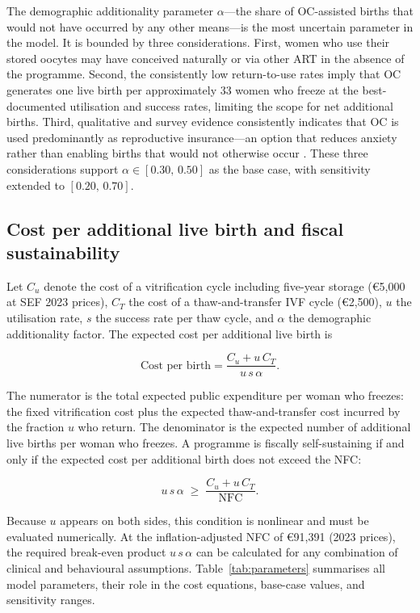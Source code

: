 \documentclass[12pt,a4paper]{article}
\begin{document}
The demographic additionality parameter $\alpha$---the share of
OC-assisted births that would not have occurred by any other means---is
the most uncertain parameter in the model. It is bounded by three
considerations. First, women who use their stored oocytes may have
conceived naturally or via other ART in the absence of the programme.
Second, the consistently low return-to-use rates imply that OC
generates one live birth per approximately 33 women who freeze at the
best-documented utilisation and success rates, limiting the scope for
net additional births. Third, qualitative and survey evidence
consistently indicates that OC is used predominantly as reproductive
insurance---an option that reduces anxiety rather than enabling births
that would not otherwise occur
\citep{kynigopoulou2024,gambadauro2023}. These three considerations
support $\alpha \in [0.30,\,0.50]$ as the base case, with sensitivity
extended to $[0.20,\,0.70]$.

\subsection{Cost per additional live birth and fiscal
sustainability}\label{sec:cost}

Let $C_u$ denote the cost of a vitrification cycle including five-year
storage (\euro{}5,000 at SEF 2023 prices), $C_T$ the cost of a
thaw-and-transfer IVF cycle (\euro{}2,500), $u$ the utilisation rate,
$s$ the success rate per thaw cycle, and $\alpha$ the demographic
additionality factor. The expected cost per additional live birth is

\begin{equation}
\text{Cost per birth} = \frac{C_u + u\,C_T}{u\,s\,\alpha}.
\label{eq:cost}
\end{equation}

\noindent The numerator is the total expected public expenditure per
woman who freezes: the fixed vitrification cost plus the expected
thaw-and-transfer cost incurred by the fraction $u$ who return. The
denominator is the expected number of additional live births per woman
who freezes. A programme is fiscally self-sustaining if and only if the
expected cost per additional birth does not exceed the NFC:

\begin{equation}
u\,s\,\alpha \;\geq\; \frac{C_u + u\,C_T}{\mathrm{NFC}}.
\label{eq:fiscal}
\end{equation}

\noindent Because $u$ appears on both sides, this condition is
nonlinear and must be evaluated numerically. At the inflation-adjusted
NFC of \euro{}91,391 (2023 prices), the required break-even product
$u\,s\,\alpha$ can be calculated for any combination of clinical and
behavioural assumptions. Table~\ref{tab:parameters} summarises all
model parameters, their role in the cost equations, base-case values,
and sensitivity ranges.
\end{document}
